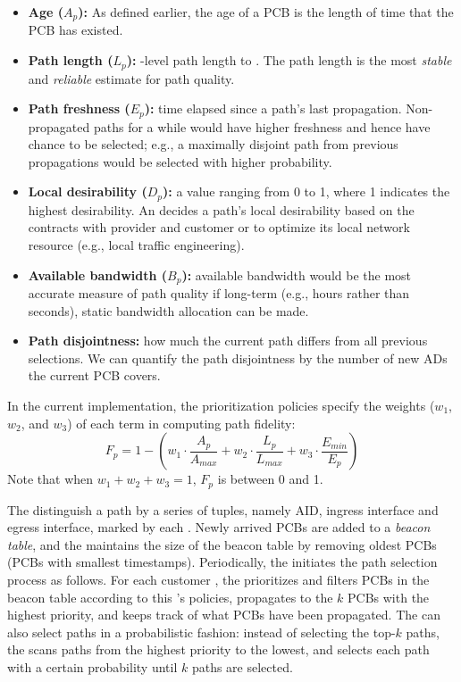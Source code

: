 \begin{itemize}
\item {\bf Age ($A_p$):} As defined earlier, the age of a PCB is the
  length of time that the PCB has existed.
\item {\bf Path length ($L_p$):} \AD-level path length to \TDC. The
  path length is the most {\em stable} and {\em reliable} estimate for
  path quality.
\item {\bf Path freshness ($E_p$):} time elapsed since a path's last
  propagation. Non-propagated paths for a while would have higher
  freshness and hence have chance to be selected; e.g., a maximally
  disjoint path from previous propagations would be selected with
  higher probability.
\item {\bf Local desirability ($D_p$):} a value ranging from 0 to 1,
  where 1 indicates the highest desirability. An \AD decides a path's
  local desirability based on the contracts with provider and customer
  \ADs or to optimize its local network resource (e.g., local traffic
  engineering).
\item {\bf Available bandwidth ($B_p$):} available bandwidth would be
  the most accurate measure of path quality if long-term (e.g., hours
  rather than seconds), static bandwidth allocation can be made.
\item {\bf Path disjointness:} how much the current path differs from
  all previous selections. We can quantify the path disjointness by
  the number of new ADs the current PCB covers.
\end{itemize}

In the current implementation, the prioritization policies specify the
weights ($w_1$, $w_2$, and $w_3$) of each term in computing path
fidelity:
\[
F_p = 1 - (w_1 \cdot \frac{A_p}{A_{max}} + w_2 \cdot \frac{L_p}{L_{max}} + w_3 \cdot \frac{E_{min}}{E_{p}})
\]
Note that when $w_1 + w_2 + w_3 = 1$, $F_p$ is between 0 and 1.


The \BS distinguish a path by a series of tuples, namely AID, ingress
interface and egress interface, marked by each \AD. Newly arrived PCBs
are added to a {\em beacon table}, and the \BS maintains the size of
the beacon table by removing oldest PCBs (PCBs with smallest
timestamps).    Periodically, the \BS initiates the path
selection process as follows. For each customer \AD, the \BS
prioritizes and filters PCBs in the beacon table according to this
\AD's policies, propagates to the \AD $k$ PCBs with the highest
priority, and keeps track of what PCBs have been propagated. The \BS
can also select paths in a probabilistic fashion: instead of selecting
the top-$k$ paths, the \BS scans paths from the highest priority to
the lowest, and selects each path with a certain probability until $k$
paths are selected.



